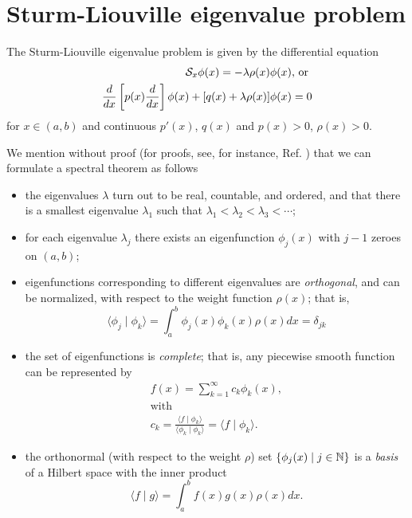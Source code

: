 \section{Sturm-Liouville eigenvalue problem}

The Sturm-Liouville eigenvalue problem is given by the differential equation
\begin{equation}
\begin{split}
{\cal S}_{x}    \phi (x) = -\lambda \rho  (x) \phi (x)\textrm{, or } \\
\frac{d}{dx}
\left[
p(x)
\frac{d}{dx}
\right] \phi(x)
+
[q(x)  +   \lambda \rho  (x) ]\phi(x)=0
\end{split}
\label{2011-m-ch-slee}
\end{equation}
for $x\in(a,b)$ and continuous  $p'(x)$, $q(x)$ and $p(x)>0$, $\rho  (x)>0$.

We mention without proof (for proofs, see, for instance, Ref. \cite{Al-Gwaiz}) that
we can formulate a spectral theorem as follows
\begin{itemize}
\item
the eigenvalues $\lambda$ turn out to be real, countable, and ordered, and that there is a smallest eigenvalue $\lambda_1$
such that $\lambda_1<\lambda_2<\lambda_3< \cdots$;

\item
for each eigenvalue $\lambda_j$ there exists an eigenfunction
$\phi_j(x)$ with $j-1$ zeroes on $(a,b)$;

\item
eigenfunctions corresponding to different eigenvalues are {\em orthogonal}, and can be normalized, with respect
to the weight function 
$\rho  (x)$; that is,
\begin{equation}
\langle \phi_j \mid \phi_k \rangle
=
\int_a^b
\phi_j (x)\phi_k(x)
\rho  (x)         dx
= \delta_{jk}
\label{2011-m-ch-slonef}
\end{equation}

\item
the set of eigenfunctions   is {\em complete}; that is, any piecewise smooth function can be represented by
\begin{equation}
\begin{split}
f(x)=\sum_{k=1}^\infty c_k\phi_k(x), \\
\textrm{with }     \\
c_k=\frac{ \langle f \mid \phi_k\rangle }  { \langle \phi_k \mid \phi_k\rangle }= \langle f \mid \phi_k\rangle .
\end{split}
\label{2011-m-ch-sleecom}
\end{equation}

\item
the orthonormal (with respect to the weight $\rho $) set $\{\phi_j(x)\mid j\in {\Bbb N}\}$
is a {\em basis} of a Hilbert space with the inner product
\begin{equation}
\langle f \mid g\rangle
=
\int_a^b
f (x) g(x)
\rho  (x)         dx
.
\label{2011-m-ch-slspbtf}
\end{equation}

\end{itemize}

